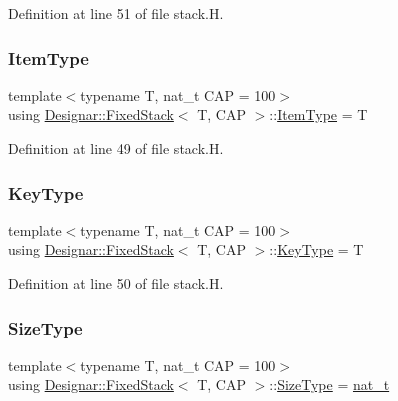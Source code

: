 Definition at line 51 of file stack.\+H.

\mbox{\label{class_designar_1_1_fixed_stack_a07f33a0a97fdebadd335de2f7f485942}} 
\subsubsection{\texorpdfstring{Item\+Type}{ItemType}}
{\footnotesize\ttfamily template$<$typename T, nat\+\_\+t C\+AP = 100$>$ \\
using \hyperlink{class_designar_1_1_fixed_stack}{Designar\+::\+Fixed\+Stack}$<$ T, C\+AP $>$\+::\hyperlink{class_designar_1_1_fixed_stack_a07f33a0a97fdebadd335de2f7f485942}{Item\+Type} =  T}



Definition at line 49 of file stack.\+H.

\mbox{\label{class_designar_1_1_fixed_stack_a9969f7d11746d55fe367a229bb75fa8f}} 
\subsubsection{\texorpdfstring{Key\+Type}{KeyType}}
{\footnotesize\ttfamily template$<$typename T, nat\+\_\+t C\+AP = 100$>$ \\
using \hyperlink{class_designar_1_1_fixed_stack}{Designar\+::\+Fixed\+Stack}$<$ T, C\+AP $>$\+::\hyperlink{class_designar_1_1_fixed_stack_a9969f7d11746d55fe367a229bb75fa8f}{Key\+Type} =  T}



Definition at line 50 of file stack.\+H.

\mbox{\label{class_designar_1_1_fixed_stack_ae82564eb2309ec7a1bfd0c5bfbefc581}} 
\subsubsection{\texorpdfstring{Size\+Type}{SizeType}}
{\footnotesize\ttfamily template$<$typename T, nat\+\_\+t C\+AP = 100$>$ \\
using \hyperlink{class_designar_1_1_fixed_stack}{Designar\+::\+Fixed\+Stack}$<$ T, C\+AP $>$\+::\hyperlink{class_designar_1_1_fixed_stack_ae82564eb2309ec7a1bfd0c5bfbefc581}{Size\+Type} =  \hyperlink{namespace_designar_aa72662848b9f4815e7bf31a7cf3e33d1}{nat\+\_\+t}}



